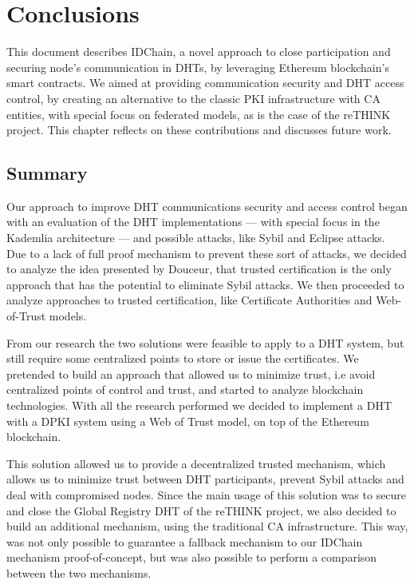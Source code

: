 \chapter{Conclusions}
\label{chapter:conclusion}

This document describes IDChain, a novel approach to close participation and securing node's communication in DHTs, by leveraging Ethereum blockchain's smart contracts.
We aimed at providing communication security and DHT access control, by creating an alternative to the classic PKI infrastructure with \acl{CA} entities, with special focus on federated models, as is the case of the reTHINK project.
This chapter reflects on these contributions and discusses future work.

\section{Summary}
\label{section:summary}
Our approach to improve DHT communications security and access control began with an evaluation of the DHT implementations — with special focus in the Kademlia architecture — and possible attacks, like Sybil and Eclipse attacks.
Due to a lack of full proof mechanism to prevent these sort of attacks, we decided to analyze the idea presented by Douceur\cite{Douceur2002}, that trusted certification is the only approach that has the potential to eliminate Sybil attacks.
We then proceeded to analyze approaches to trusted certification, like Certificate Authorities and Web-of-Trust models.

From our research the two solutions were feasible to apply to a DHT system, but still require some centralized points to store or issue the certificates.
We pretended to build an approach that allowed us to minimize trust, i.e avoid centralized points of control and trust, and started to analyze blockchain technologies.
With all the research performed we decided to implement a DHT with a DPKI system using a Web of Trust model, on top of the Ethereum blockchain.

This solution allowed us to provide a decentralized trusted mechanism, which allows us to minimize trust between DHT participants, prevent Sybil attacks and deal with compromised nodes.
Since the main usage of this solution was to secure and close the Global Registry DHT of the reTHINK project, we also decided to build an additional mechanism, using the traditional CA infrastructure.
This way, was not only possible to guarantee a fallback mechanism to our IDChain mechanism proof-of-concept, but was also possible to perform a comparison between the two mechanisms.

